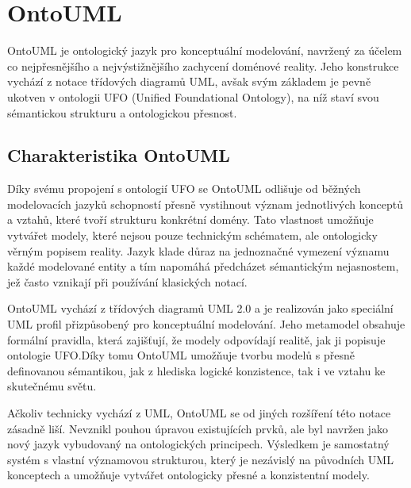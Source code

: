 
\section{OntoUML}
\label{sec:ontouml}
OntoUML je ontologický jazyk pro konceptuální modelování, navržený za účelem co nejpřesnějšího a nejvýstižnějšího zachycení doménové reality. Jeho konstrukce vychází z notace třídových diagramů UML, avšak svým základem je pevně ukotven v ontologii UFO (Unified Foundational Ontology), na níž staví svou sémantickou strukturu a ontologickou přesnost. \cite{Pergl2018,Rybola2017}


\subsection{Charakteristika OntoUML}
\label{sec:charakteristika-ontouml}
Díky svému propojení s ontologií UFO se OntoUML odlišuje od běžných modelovacích jazyků schopností přesně vystihnout význam jednotlivých konceptů a vztahů, které tvoří strukturu konkrétní domény. Tato vlastnost umožňuje vytvářet modely, které nejsou pouze technickým schématem, ale ontologicky věrným popisem reality. Jazyk klade důraz na jednoznačné vymezení významu každé modelované entity a tím napomáhá předcházet sémantickým nejasnostem, jež často vznikají při používání klasických notací. \cite{Guizzardi2015, Pergl2013}

OntoUML vychází z třídových diagramů UML 2.0 a je realizován jako speciální UML profil přizpůsobený pro konceptuální modelování. Jeho metamodel obsahuje formální pravidla, která zajišťují, že modely odpovídají realitě, jak ji popisuje ontologie UFO.Díky tomu OntoUML umožňuje tvorbu modelů s přesně definovanou sémantikou, jak z hlediska logické konzistence, tak i ve vztahu ke skutečnému světu. \cite{Pergl2018}

Ačkoliv technicky vychází z UML, OntoUML se od jiných rozšíření této notace zásadně liší. Nevznikl pouhou úpravou existujících prvků, ale byl navržen jako nový jazyk vybudovaný na ontologických principech. Výsledkem je samostatný systém s vlastní významovou strukturou, který je nezávislý na původních UML konceptech a umožňuje vytvářet ontologicky přesné a konzistentní modely. \cite{CCMi_ontouml}


